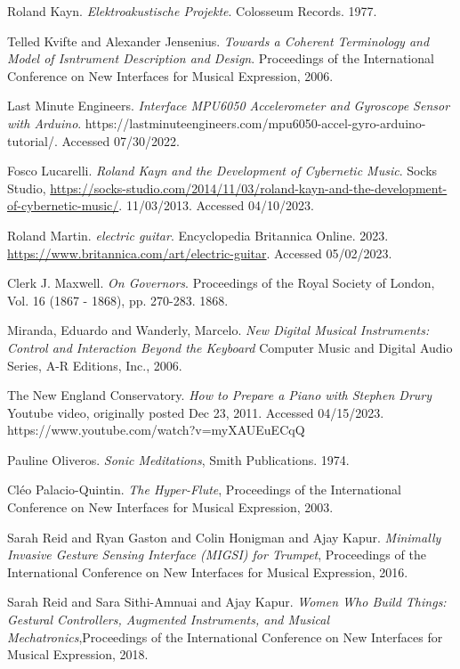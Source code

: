 \begin{thebibliography}{99}
 Roland Kayn. \emph{Elektroakustische Projekte}. Colosseum Records. 1977.

 Telled Kvifte and Alexander Jensenius. \emph{Towards a Coherent Terminology and Model of Isntrument Description and Design}. Proceedings of the International Conference on New Interfaces for Musical Expression, 2006.

 Last Minute Engineers. \emph{Interface MPU6050 Accelerometer and Gyroscope Sensor with Arduino}. https://lastminuteengineers.com/mpu6050-accel-gyro-arduino-tutorial/. Accessed 07/30/2022.

 Fosco Lucarelli. \emph{Roland Kayn and the Development of Cybernetic Music}. Socks Studio, \url{https://socks-studio.com/2014/11/03/roland-kayn-and-the-development-of-cybernetic-music/}. 11/03/2013. Accessed 04/10/2023.

 Roland Martin. \emph{electric guitar}. Encyclopedia Britannica Online. 2023. \url{https://www.britannica.com/art/electric-guitar}. Accessed 05/02/2023.

  Clerk J. Maxwell. \emph{On Governors}. Proceedings of the Royal Society of London, Vol. 16 (1867 - 1868), pp. 270-283. 1868.

 Miranda, Eduardo and Wanderly, Marcelo. \emph{New Digital Musical Instruments: Control and Interaction Beyond the Keyboard} Computer Music and Digital Audio Series, A-R Editions, Inc., 2006.

 The New England Conservatory. \emph{How to Prepare a Piano with Stephen Drury} Youtube video, originally posted Dec 23, 2011. Accessed 04/15/2023. https://www.youtube.com/watch?v=myXAUEuECqQ

 Pauline Oliveros. \emph{Sonic Meditations}, Smith Publications. 1974.

 Cléo Palacio-Quintin. \emph{The Hyper-Flute}, Proceedings of the International Conference on New Interfaces for Musical Expression, 2003.

 Sarah Reid and Ryan Gaston and Colin Honigman and Ajay Kapur. \emph{Minimally Invasive Gesture Sensing Interface (MIGSI) for Trumpet}, Proceedings of the International Conference on New Interfaces for Musical Expression, 2016.

 Sarah Reid and Sara Sithi-Amnuai and Ajay Kapur. \emph{Women Who Build Things: Gestural Controllers, Augmented Instruments, and Musical Mechatronics},Proceedings of the International Conference on New Interfaces for Musical Expression, 2018.


\end{thebibliography}
